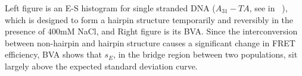 Left figure is an E-S histogram for single stranded DNA ($A_{31}-TA$, see in ~\cite{Tsukanov_2013}), which is designed to form a hairpin structure temporarily and reversibly in the presence of 400mM NaCl, and Right figure is its BVA. Since the interconversion between non-hairpin and hairpin structure causes a significant change in FRET efficiency, BVA shows that $s_E$, in the bridge region between two populations, sit largely above the expected standard deviation curve.